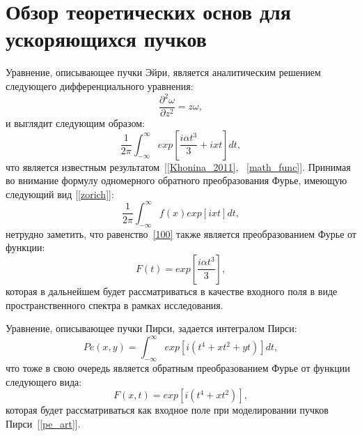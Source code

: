     \section{Обзор теоретических основ для ускоряющихся пучков}
    {

    \vspace{-0.2cm}
    Уравнение, описывающее пучки Эйри, является аналитическим решением
    следующего дифференциального уравнения:
    \begin{equation*}
        \label{1}
        \frac{\partial^2 \omega}{\partial z^2} = z \omega,
    \end{equation*}
    и выглядит следующим образом:
    \begin{equation}
        \label{2}
        \frac{1 }{2 \pi}\int_{- \infty}^{\infty} exp[{\frac{i\alpha t^3}{3} + ixt}]dt,
    \end{equation}
    что является известным результатом~[\ref{Khonina_2011}, ~\ref{math_func}].
    Принимая во внимание формулу одномерного обратного преобразования Фурье, имеющую следующий вид [\ref{zorich}]:
    \begin{equation}
        \label{100}
        \frac{1 }{2 \pi}\int_{- \infty}^{\infty} f(x)exp[ixt]dt,
    \end{equation}
    нетрудно заметить, что равенство~\eqref{100} также является
    преобразованием Фурье от функции:
    \begin{equation}
        \label{airy_eq}
        F(t) = exp[\frac{i \alpha t^3}{3}],
    \end{equation}
    которая в дальнейшем будет рассматриваться в качестве входного поля в виде пространственного спектра в
    рамках исследования.

    Уравнение, описывающее пучки Пирси, задается интегралом Пирси:
    \begin{equation*}
        \label{4}
        Pe(x, y)  = \int_{-\infty}^{\infty}exp[i(t^4 + xt^2 +yt)]dt,
    \end{equation*}
    что тоже в свою очередь является обратным преобразованием Фурье от функции
    следующего вида:
    \begin{equation*}
        \label{5}
        F(x, t)  = exp[i(t^4 + xt^2)],
    \end{equation*}
    которая будет рассматриваться как входное поле при моделировании пучков
    Пирси~[\ref{pe_art}].

}
